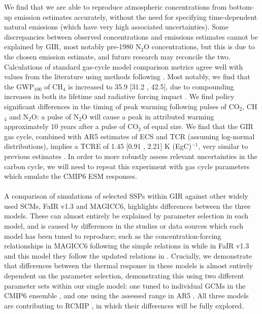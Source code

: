 \documentclass[gmd, manuscript]{copernicus}
\begin{document}
We find that we are able to reproduce atmospheric concentrations from bottom-up emission estimates accurately, without the need for specifying time-dependent natural emissions (which have very high associated uncertainties). Some discrepancies between observed concentrations and emissions estimates cannot be explained by GIR, most notably pre-1980 N$_2$O concentrations, but this is due to the chosen emission estimate, and future research may reconcile the two. Calculations of standard gas-cycle model comparison metrics agree well with values from the literature using methods following \cite{Joos2013}. Most notably, we find that the GWP$_{100}$ of CH$_4$ is increased to 35.9 [31.2 , 42.5], due to compounding increases in both its lifetime and radiative forcing impact \citep{Etminan2016,Holmes2013}. We find policy significant differences in the timing of peak warming following pulses of CO$_2$, CH$_4$ and N$_2$O: a pulse of N$_2$O will cause a peak in attributed warming approximately 10 years after a pulse of CO$_2$ of equal size. We find that the GIR gas cycle, combined with AR5 estimates of ECS and TCR \citep{Myhre2013a} (assuming log-normal distributions), implies a TCRE of 1.45 [0.91 , 2.21] K (EgC)$^{-1}$, very similar to previous estimates \citep{Millar20160449}. In order to more robustly assess relevant uncertainties in the carbon cycle, we will need to repeat this experiment with gas cycle parameters which emulate the CMIP6 ESM responses.\\\\
A comparison of simulations of selected SSPs within GIR against other widely used SCMs, FaIR v1.3 and MAGICC6, highlights differences between the three models. These can almost entirely be explained by parameter selection in each model, and is caused by differences in the studies or data sources which each model has been tuned to reproduce; such as the concentration-forcing relationships in MAGICC6 following the simple relations in \cite{Myhre2013a} while in FaIR v1.3 and this model they follow the updated relations in \cite{Etminan2016}. Crucially, we demonstrate that differences between the thermal response in these models is almost entirely dependent on the parameter selection, demonstrating this using two different parameter sets within our single model: one tuned to individual GCMs in the CMIP6 ensemble \citep{Tsutsui2017}, and one using the assessed range in AR5 \citep{Collins2013}. All three models are contributing to RCMIP \cite{Nicholls2019}, in which their differences will be fully explored.\\\\
\end{document}
